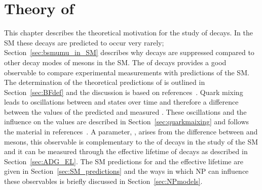 \chapter{{\bf Theory of }}
\label{sec:theory_chptr}
This chapter describes the theoretical motivation for the study of \bmumu decays. 
In the SM these decays are predicted to occur very rarely; Section~\ref{sec:bsmumu_in_SM} describes why \bmumu decays are suppressed compared to other decay modes of \bsd mesons in the SM. The \BF of \bmumu decays provides a good observable to compare experimental measurements with predictions of the SM. The determination of the theoretical predictions of \BFs is outlined in Section~\ref{sec:BFdef} and the discussion is based on references~\cite{Blake:2016olu,Anikeev:2001rk}.
Quark mixing leads to oscillations between \bs and \barbs states over time and therefore a difference between the values of the predicted and measured \bsmumu \BFs. These oscillations and the influence on the \BFs values are described in Section~\ref{sec:quarkmaixing} and follows the material in references~\cite{ Anikeev:2001rk,Dunietz:2000cr,Nierste:2009wg}. 
A parameter, \ADG, arises from the difference between \bs and \barbs mesons, this observable is complementary to the \BF of \bsmumu decays in the study of the SM and it can be measured through the effective lifetime of \bsmumu decays as described in Section~\ref{sec:ADG_EL}. The SM predictions for \bmumu \BFs and the \bsmumu effective lifetime are given in Section~\ref{sec:SM_predictions} and the ways in which NP can influence these observables is briefly discussed in Section~\ref{sec:NPmodels}.



